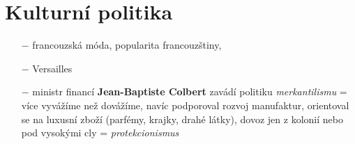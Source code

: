 \documentclass{article}
\begin{document}
\section*{Kulturní politika}
\begin{itemize}
    \vspace{-0.5em}
    \setlength\itemsep{0.15em}
    \item[$-$] francouzská móda, popularita francouzštiny, 
    \item[$-$] Versailles
    \item[$-$] ministr financí \textbf{Jean-Baptiste Colbert} zavádí politiku \textit{merkantilismu} = více vyvážíme než dovážíme, navíc podporoval rozvoj manufaktur, orientoval se na luxusní zboží (parfémy, krajky, drahé látky), dovoz jen z kolonií nebo pod vysokými cly = \textit{protekcionismus}     
\end{itemize}
\end{document}
